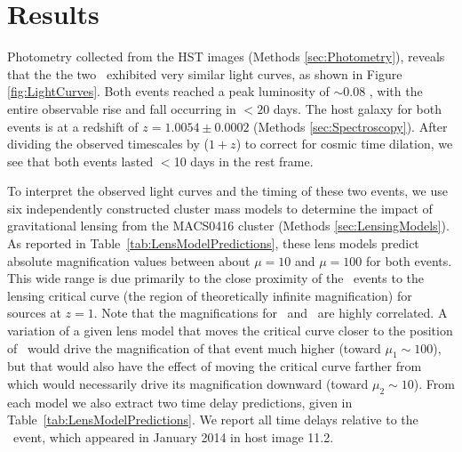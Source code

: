 \section{Results}\label{sec:Results}

Photometry collected from the HST images (Methods
\ref{sec:Photometry}), reveals that the the two \spock\ exhibited very
similar light curves, as shown in Figure \ref{fig:LightCurves}.  Both
events reached a peak luminosity of $\sim$0.08 \microjansky, with the
entire observable rise and fall occurring in $<20$ days.  The host
galaxy for both \spock events is at a redshift of $z=1.0054\pm0.0002$
(Methods \ref{sec:Spectroscopy}).  After dividing the observed
timescales by ($1+z$) to correct for cosmic time dilation, we see that
both events lasted $<$10 days in the rest frame.

To interpret the observed light curves and the timing of these two
events, we use six independently constructed cluster mass models to
determine the impact of gravitational lensing from the MACS0416
cluster (Methods \ref{sec:LensingModels}).  As reported in
Table~\ref{tab:LensModelPredictions}, these lens models predict
absolute magnification values between about $\mu=10$ and $\mu=100$ for
both events.  This wide range is due primarily to the close proximity
of the \spock\ events to the lensing critical curve (the region of
theoretically infinite magnification) for sources at $z=1$.  Note that
the magnifications for \spockone\ and \spocktwo\ are highly
correlated.  A variation of a given lens model that moves the critical
curve closer to the position of \spockone\ would drive the
magnification of that event much higher (toward $\mu_1\sim100$), but
that would also have the effect of moving the critical curve farther
from \spocktwo\, which would necessarily drive its magnification
downward (toward $\mu_2\sim10$). From each model we also extract two
time delay predictions, given in Table~\ref{tab:LensModelPredictions}.
We report all time delays relative to the \spockone\ event, which
appeared in January 2014 in host image 11.2.

